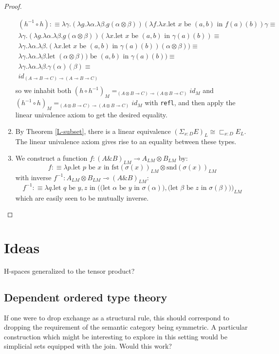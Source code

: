 \begin{thm}
\begin{proof}
\begin{enumerate}
\[\begin{split}
          (h^{-1} \circ h) : \equiv \lambda \gamma. ( \lambda g. \lambda \alpha. \lambda \beta. g(\alpha \otimes \beta))(\lambda f. \lambda x . \text{let $x$ be $(a, b)$ in $f(a)(b)$}) \gamma \equiv\\
          \lambda \gamma. ( \lambda g. \lambda \alpha. \lambda \beta. g(\alpha \otimes \beta))(\lambda x . \text{let $x$ be $(a, b)$ in $\gamma(a)(b)$}) \equiv\\
          \lambda \gamma. \lambda \alpha. \lambda \beta. (\lambda x . \text{let $x$ be $(a, b)$ in $\gamma(a)(b)$})(\alpha \otimes \beta)) \equiv\\
          \lambda \gamma. \lambda \alpha. \lambda \beta. \text{let $(\alpha \otimes \beta))$ be $(a, b)$ in $\gamma(a)(b)$}) \equiv\\
          \lambda \gamma. \lambda \alpha. \lambda \beta. \gamma(\alpha)(\beta) \equiv\\
    id_{(A \multimap B \multimap C) \multimap (A \multimap B \multimap C)}\\
        \end{split}
      \]
      so we inhabit both $(h \circ h^{-1})_M =_{(A \otimes B \multimap C) \multimap (A \otimes B \multimap C)} id_M$ and $(h^{-1} \circ h)_M =_{(A \otimes B \multimap C) \multimap (A \otimes B \multimap C)} id_M$ with \texttt{refl}, and then apply the linear univalence axiom to get the desired equality.
    \item By Theorem \ref{L-subset}, there is a linear equivalence $(\Sigma_{x :D}E)_L \cong \sqsubset_{x :D}E_L$. The linear univalence axiom gives rise to an equality between these types.
    \item We construct a function $f : (A \& B)_{LM} \multimap A_{LM} \otimes B_{LM}$ by:
      \[
        f :\equiv \lambda p. \text{let $p$ be $x$ in $\text{fst}(\sigma(x))_{LM} \otimes \text{snd}(\sigma(x))_{LM}$}
      \]
      with inverse $f^{-1} : A_{LM} \otimes B_{LM} \multimap  (A \& B)_{LM}$:
      \[
        f^{-1} :\equiv \lambda q. \text{let $q$ be $y, z$ in $\Big (\big ($let $\alpha$ be $y$ in $\sigma(\alpha) \big ), \big ($let $\beta$ be $z$ in $\sigma(\beta) \big) \Big )_{LM}$}
      \]
      which are easily seen to be mutually inverse.
      \end{enumerate}
    \end{proof}
  \end{thm}
\section{Ideas}
H-spaces generalized to the tensor product?
\subsection{Dependent ordered type theory}
If one were to drop exchange as a structural rule, this should correspond to dropping the requirement of the semantic category being symmetric. A particular construction which might be interesting to explore in this setting would be simplicial sets equipped with the join. Would this work?
\nocite{benton1995mixed}
\nocite{hofmann1997syntax}




